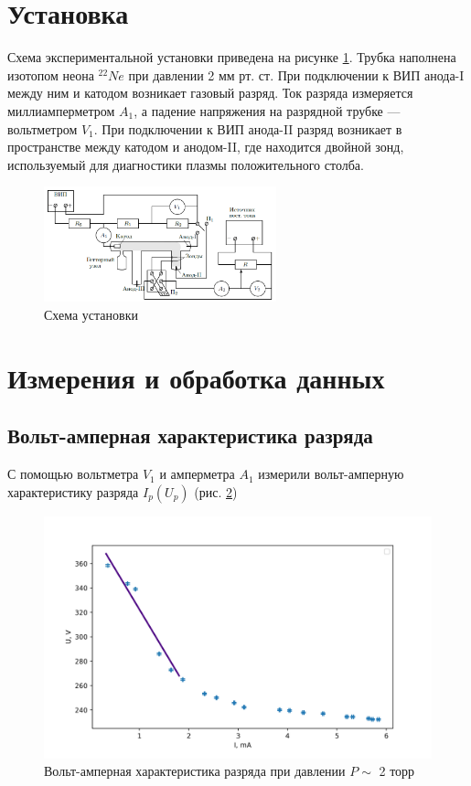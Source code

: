 \documentclass[a4paper,12pt]{article} %
\begin{document}
\section{Установка}
Схема экспериментальной установки приведена на рисунке \ref{установка}. Трубка наполнена изотопом неона $^{22}Ne$ при давлении 2 мм рт. ст. При подключении к ВИП анода-I между ним и катодом возникает газовый разряд. Ток разряда измеряется миллиамперметром $A_1$, а падение
напряжения на разрядной трубке — вольтметром $V_1$. При подключении к ВИП анода-II разряд возникает в пространстве между катодом и анодом-II, где находится двойной зонд, используемый
для диагностики плазмы положительного столба.
\begin{figure}[h!]
\begin{center}
\includegraphics[width=0.6\textwidth]{Установка}
\caption{Схема установки} \label{установка}
\end{center}
\end{figure}

\section{Измерения и обработка данных}
\subsection{Вольт-амперная характеристика разряда}
С помощью вольтметра $V_1$ и амперметра $A_1$ измерили вольт-амперную
характеристику разряда $I_p(U_p)$ (рис. \ref{ВАХ_разряда})

\begin{figure}[h!]
\begin{center}
\includegraphics[width=\textwidth]{U(I)_discharge}
\caption{Вольт-амперная характеристика разряда при давлении $P \sim$ 2 торр} \label{ВАХ_разряда}
\end{center}
\end{figure}
\end{document}
